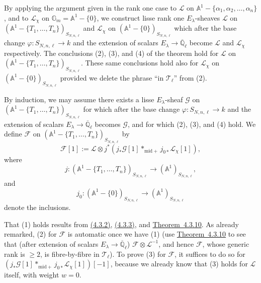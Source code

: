 By applying the argument given in the rank one case to \(\mathcal{L}\) on
\(\mathbb{A}^1-\{\alpha_1,\alpha_2,\ldots,\alpha_n\}\), and to
\(\mathcal{L}_\chi\) on \(\mathbb{G}_m=\mathbb{A}^1-\{0\}\), we construct
lisse rank one \(E_\lambda\)-sheaves \(\mathcal{L}\) on
\((\mathbb{A}^1-\{T_1,\ldots,T_n\})_{S_{N,n,\ell}}\) and
\(\mathcal{L}_\chi\) on \((\mathbb{A}^1-\{0\})_{S_{N,n,\ell}}\) which after
the base change \(\varphi:S_{N,n,\ell}\to k\) and the extension of scalars
\(E_\lambda\to\overline{\mathbb{Q}}_\ell\) become \(\mathcal{L}\) and
\(\mathcal{L}_\chi\) respectively. The conclusions (2), (3), and (4) of the
theorem hold for \(\mathcal{L}\) on
\((\mathbb{A}^1-\{T_1,\ldots,T_n\})_{S_{N,n,\ell}}\). These same conclusions
hold also for \(\mathcal{L}_\chi\) on
\((\mathbb{A}^1-\{0\})_{S_{N,n,\ell}}\) provided we delete the phrase ``in
\(\mathcal{T}_\ell\)'' from (2).

By induction, we may assume there exists a lisse \(E_\lambda\)-sheaf
\(\mathcal{G}\) on
\((\mathbb{A}^1-\{T_1,\ldots,T_n\})_{S_{N,n,\ell}}\) for which after the base
change \(\varphi:S_{N,n,\ell}\to k\) and the extension of scalars
\(E_\lambda\to\overline{\mathbb{Q}}_\ell\) becomes \(\mathcal{G}\), and for
which (2), (3), and (4) hold. We define \(\mathcal{F}\) on
\((\mathbb{A}^1-\{T_1,\ldots,T_n\})_{S_{N,n,\ell}}\) by
\[
  \mathcal{F}[1]:=
  \mathcal{L}\otimes
  j^*(j_*\mathcal{G}[1]*_{\mathrm{mid}+}j_{0*}\mathcal{L}_\chi[1]),
\]
where
\[
  j:(\mathbb{A}^1-\{T_1,\ldots,T_n\})_{S_{N,n,\ell}}\to
  (\mathbb{A}^1)_{S_{N,n,\ell}},
\]
and
\[
  j_0:(\mathbb{A}^1-\{0\})_{S_{N,n,\ell}}\to
  (\mathbb{A}^1)_{S_{N,n,\ell}}
\]
denote the inclusions.

That (1) holds results from \hyperref[par:4.3.2]{(4.3.2)},
\hyperref[par:4.3.3]{(4.3.3)}, and \hyperref[thm:4.3.10]{Theorem~4.3.10}. As
already remarked, (2) for \(\mathcal{F}\) is automatic once we have (1) (use
\hyperref[thm:4.3.10]{Theorem~4.3.10} to see that (after extension of scalars
\(E_\lambda\to\overline{\mathbb{Q}}_\ell\))
\(\mathcal{F}\otimes\mathcal{L}^{-1}\), and hence \(\mathcal{F}\), whose
generic rank is \(\geq 2\), is fibre-by-fibre in \(\mathcal{T}_\ell\)). To
prove (3) for \(\mathcal{F}\), it suffices to do so for
\((j_*\mathcal{G}[1]*_{\mathrm{mid}+}j_{0*}\mathcal{L}_\chi[1])[-1]\), because
we already know that (3) holds for \(\mathcal{L}\) itself, with weight \(w=0\).

